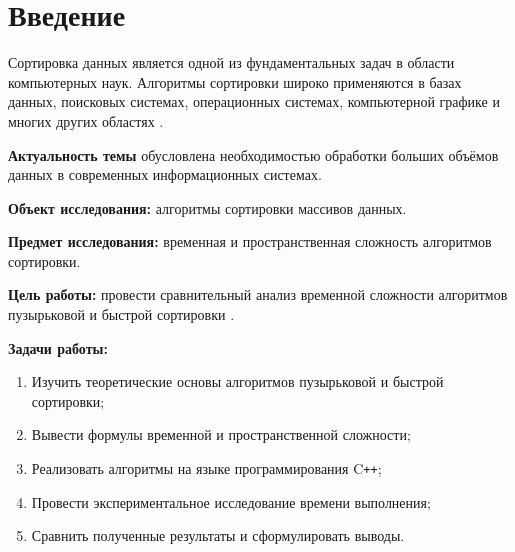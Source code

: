 \section{Введение}

Сортировка данных является одной из фундаментальных задач в области компьютерных наук. Алгоритмы сортировки широко применяются в базах данных, поисковых системах, операционных системах, компьютерной графике и многих других областях \cite{knuth1998art}.

\textbf{Актуальность темы} обусловлена необходимостью обработки больших объёмов данных в современных информационных системах.

\textbf{Объект исследования:} алгоритмы сортировки массивов данных.

\textbf{Предмет исследования:} временная и пространственная сложность алгоритмов сортировки.

\textbf{Цель работы:} провести сравнительный анализ временной сложности алгоритмов пузырьковой и быстрой сортировки \cite{hoare1962quicksort}.

\textbf{Задачи работы:}
\begin{enumerate}
    \item Изучить теоретические основы алгоритмов пузырьковой и быстрой сортировки;
    \item Вывести формулы временной и пространственной сложности;
    \item Реализовать алгоритмы на языке программирования C\texttt{++};
    \item Провести экспериментальное исследование времени выполнения;
    \item Сравнить полученные результаты и сформулировать выводы.
\end{enumerate}